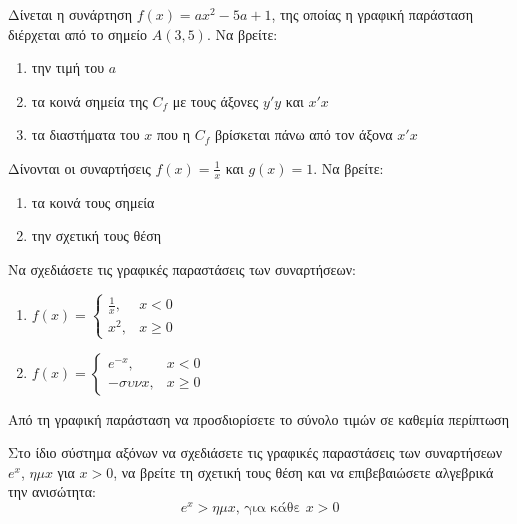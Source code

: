 \documentclass{presentation}
\begin{document}
\begin{askisi}
  Δίνεται η συνάρτηση $f(x)=ax^2-5a+1$, της οποίας η γραφική παράσταση διέρχεται από το σημείο $Α(3,5)$. Να βρείτε:
  \begin{enumerate}
    \item<1-> την τιμή του $a$
    \item<2-> τα κοινά σημεία της $C_f$ με τους άξονες $y'y$ και $x'x$
    \item<3-> τα διαστήματα του $x$ που η $C_f$ βρίσκεται πάνω από τον άξονα $x'x$
  \end{enumerate}
\end{askisi}

\begin{askisi}
  Δίνονται οι συναρτήσεις $f(x)=\frac{1}{x}$ και $g(x)=1$. Να βρείτε:
  \begin{enumerate}
    \item<1-> τα κοινά τους σημεία
    \item<2-> την σχετική τους θέση
  \end{enumerate}
\end{askisi}

\begin{askisi}
  Να σχεδιάσετε τις γραφικές παραστάσεις των συναρτήσεων:
  \begin{enumerate}
    \item<1->
          $f(x)=
            \begin{cases}
              \frac{1}{x}, & x<0    \\
              x^2,         & x\ge 0
            \end{cases}$

    \item<2-> $f(x)=
            \begin{cases}
              e^{-x}, & x<0    \\
              -συν x, & x\ge 0
            \end{cases}$
  \end{enumerate}
  Από τη γραφική παράσταση να προσδιορίσετε το σύνολο τιμών σε καθεμία περίπτωση
\end{askisi}

\begin{askisi}
  Στο ίδιο σύστημα αξόνων να σχεδιάσετε τις γραφικές παραστάσεις των συναρτήσεων $e^x$, $ημ x$ για $x>0$, να βρείτε τη σχετική τους θέση και να επιβεβαιώσετε αλγεβρικά την ανισώτητα:
  $$e^x>ημ x \text{, για κάθε } x>0$$
\end{askisi}
\end{document}
